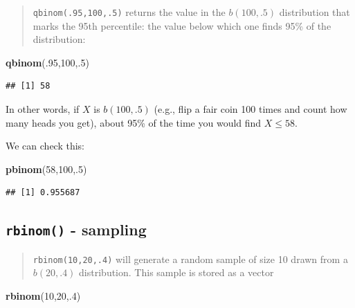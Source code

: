 \documentclass[
]{book}
\newenvironment{Shaded}{\begin{snugshade}}{\end{snugshade}}
\newcommand{\DecValTok}[1]{\textcolor[rgb]{0.00,0.00,0.81}{#1}}
\newcommand{\FunctionTok}[1]{\textcolor[rgb]{0.13,0.29,0.53}{\textbf{#1}}}
\newcommand{\NormalTok}[1]{#1}
\theoremstyle{definition}
\theoremstyle{definition}
\theoremstyle{definition}
\theoremstyle{definition}
\theoremstyle{remark}
\begin{document}
\begin{quote}
\texttt{qbinom(.95,100,.5)} returns the value in the \(b(100,.5)\) distribution that marks the 95th percentile: the value below which one finds 95\% of the distribution:
\end{quote}

\begin{Shaded}
\begin{Highlighting}[]
\FunctionTok{qbinom}\NormalTok{(.}\DecValTok{95}\NormalTok{,}\DecValTok{100}\NormalTok{,.}\DecValTok{5}\NormalTok{)}
\end{Highlighting}
\end{Shaded}

\begin{verbatim}
## [1] 58
\end{verbatim}

In other words, if \(X\) is \(b(100,.5)\) (e.g., flip a fair coin 100 times and count how many heads you get), about 95\% of the time you would find \(X \leq 58\).

We can check this:

\begin{Shaded}
\begin{Highlighting}[]
\FunctionTok{pbinom}\NormalTok{(}\DecValTok{58}\NormalTok{,}\DecValTok{100}\NormalTok{,.}\DecValTok{5}\NormalTok{)}
\end{Highlighting}
\end{Shaded}

\begin{verbatim}
## [1] 0.955687
\end{verbatim}

\subsection*{\texorpdfstring{\texttt{rbinom()} - sampling}{rbinom() - sampling}}\label{rbinom---sampling}

\begin{quote}
\texttt{rbinom(10,20,.4)} will generate a random sample of size 10 drawn from a \(b(20,.4)\) distribution. This sample is stored as a vector
\end{quote}

\begin{Shaded}
\begin{Highlighting}[]
\FunctionTok{rbinom}\NormalTok{(}\DecValTok{10}\NormalTok{,}\DecValTok{20}\NormalTok{,.}\DecValTok{4}\NormalTok{)}
\end{Highlighting}
\end{Shaded}
\end{document}

